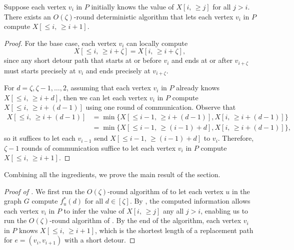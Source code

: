 \begin{lemma}\label{lem:short_recursive}
Suppose each vertex $v_i$ in $P$ initially knows the value of $X[i, \, \geq j]$ for all $j > i$. There exists an $O(\zeta)$-round deterministic algorithm that lets each vertex $v_i$ in $P$ compute $X[\leq i, \, \geq i+1]$.
\end{lemma}
\begin{proof}
For the base case, each vertex $v_i$ can locally compute 
\[X[\leq i, \, \geq i+\zeta]=X[i, \, \geq i+\zeta],\]
since any short detour path that starts at or before $v_{i}$ and ends at or after  $v_{i+\zeta}$ must starts precisely at $v_{i}$ and ends precisely at $v_{i+\zeta}$.

For $d = \zeta, \zeta-1, \ldots, 2$, assuming that each vertex $v_i$ in $P$ already knows $X[\leq i, \, \geq i+d]$, then we can let each vertex $v_i$ in $P$ compute $X[\leq i, \, \geq i+(d-1)]$ using one round of communication. Observe that
\begin{align*}
  X[\leq i, \, \geq i+(d-1)] &= \min\{X[\leq i-1, \, \geq i+(d-1)], X[i, \, \geq i+(d-1)]\}\\
  &= \min\{X[\leq i-1, \, \geq (i-1) + d], X[i, \, \geq i+(d-1)]\},
\end{align*}
so it suffices to let each $v_{i-1}$ send $X[\leq i-1, \, \geq (i-1) + d]$ to $v_i$. Therefore, $\zeta-1$ rounds of communication suffice to let each vertex $v_i$ in $P$ compute $X[\leq i, \, \geq i+1]$.
\end{proof}
 
Combining all the ingredients, we prove the main result of the section.

\begin{proof}[Proof of ]
 We first run the $O(\zeta)$-round algorithm of  to let each vertex $u$ in the graph $G$ compute $f_u^\ast(d)$ for all $d \in [\zeta]$. By , the computed information allows each vertex $v_i$ in $P$ to infer the value of  $X[i, \, \geq j]$ any all $j > i$, enabling us to run the $O(\zeta)$-round algorithm of . By the end of the algorithm, each vertex $v_i$ in $P$ knows  $X[\leq i, \, \geq i+1]$, which is the shortest length of a replacement path for $e=(v_i, v_{i+1})$ with a short detour.
\end{proof}
















